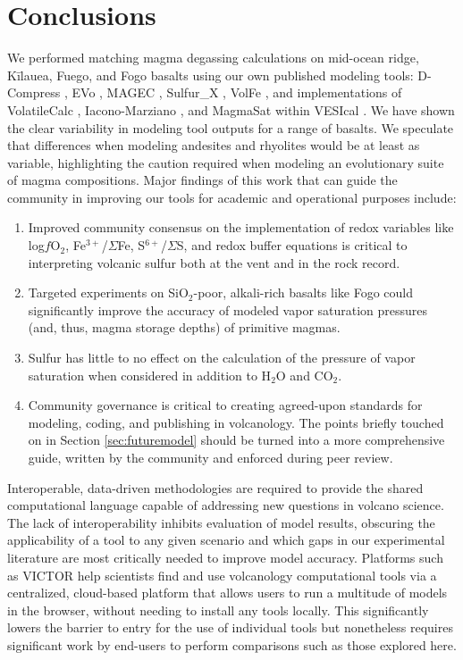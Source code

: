 \documentclass[draft, english]{volcanica-template}
\begin{document}
\section{Conclusions}
We performed matching magma degassing calculations on mid-ocean ridge, Kīlauea, Fuego, and Fogo basalts using our own published modeling tools: D-Compress \parencite{Burgisser2015}, EVo \parencite{Liggins2020,Liggins2022}, MAGEC \parencite{Sun2022,Sun2024}, Sulfur\_X \parencite{Ding2023}, VolFe \parencite{hughes2024modeling,Hughes2025volfe}, and implementations of VolatileCalc \parencite{Newman2002}, Iacono-Marziano \parencite{IaconoMarziano2012}, and MagmaSat \parencite{GhiorsoGualda2015} within VESIcal \parencite{Iacovino2021}. We have shown the clear variability in modeling tool outputs for a range of basalts. We speculate that differences when modeling andesites and rhyolites would be at least as variable, highlighting the caution required when modeling an evolutionary suite of magma compositions. Major findings of this work that can guide the community in improving our tools for academic and operational purposes include:
\begin{enumerate}
    \item Improved community consensus on the implementation of redox variables like log$f$O$_2$, Fe$^{3+}$/$\Sigma$Fe, S$^{6+}$/$\Sigma$S, and redox buffer equations is critical to interpreting volcanic sulfur both at the vent and in the rock record.
    \item Targeted experiments on SiO$_2$-poor, alkali-rich basalts like Fogo could significantly improve the accuracy of modeled vapor saturation pressures (and, thus, magma storage depths) of primitive magmas.
    \item Sulfur has little to no effect on the calculation of the pressure of vapor saturation when considered in addition to H$_2$O and CO$_2$.
    \item Community governance is critical to creating agreed-upon standards for modeling, coding, and publishing in volcanology. The points briefly touched on in Section \ref{sec:futuremodel} should be turned into a more comprehensive guide, written by the community and enforced during peer review. 
\end{enumerate}

Interoperable, data-driven methodologies are required to provide the shared computational language capable of addressing new questions in volcano science. The lack of interoperability inhibits evaluation of model results, obscuring the applicability of a tool to any given scenario and which gaps in our experimental literature are most critically needed to improve model accuracy. Platforms such as VICTOR \parencite{lev2025victor} help scientists find and use volcanology computational tools via a centralized, cloud-based platform that allows users to run a multitude of models in the browser, without needing to install any tools locally. This significantly lowers the barrier to entry for the use of individual tools but nonetheless requires significant work by end-users to perform comparisons such as those explored here. 
\end{document}
